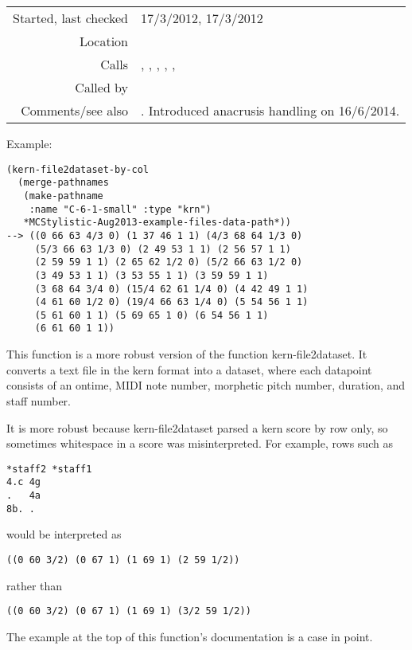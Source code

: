 \vspace{0.3cm}
\begin{tabular}{r|p{8cm}}
Started, last checked & 17/3/2012, 17/3/2012 \\
Location & \nameref{sec:kern-by-col} \\
Calls & \nameref{fun:kern-anacrusis-correction}, \nameref{fun:kern-col2dataset}, \newline \nameref{fun:kern-rows2col}, \nameref{fun:read-from-file-arbitrary}, \newline \nameref{fun:sort-dataset-asc}, \newline \nameref{fun:staves-info2staves-variable-robust} \\
Called by & \\
Comments/see also & \nameref{fun:kern-transp-file2dataset-by-col}. Intro\-duced \newline anacrusis handling on 16/6/2014.
\end{tabular}

\vspace{0.5cm}
\noindent Example:
\begin{verbatim}
(kern-file2dataset-by-col
  (merge-pathnames
   (make-pathname
    :name "C-6-1-small" :type "krn")
   *MCStylistic-Aug2013-example-files-data-path*))
--> ((0 66 63 4/3 0) (1 37 46 1 1) (4/3 68 64 1/3 0)
     (5/3 66 63 1/3 0) (2 49 53 1 1) (2 56 57 1 1)
     (2 59 59 1 1) (2 65 62 1/2 0) (5/2 66 63 1/2 0)
     (3 49 53 1 1) (3 53 55 1 1) (3 59 59 1 1)
     (3 68 64 3/4 0) (15/4 62 61 1/4 0) (4 42 49 1 1)
     (4 61 60 1/2 0) (19/4 66 63 1/4 0) (5 54 56 1 1)
     (5 61 60 1 1) (5 69 65 1 0) (6 54 56 1 1)
     (6 61 60 1 1))
\end{verbatim}

\noindent This function is a more robust version of
the function kern-file2dataset. It converts a text
file in the kern format into a dataset, where each
datapoint consists of an ontime, MIDI note number,
morphetic pitch number, duration, and staff number.

It is more robust because kern-file2dataset parsed
a kern score by row only, so sometimes whitespace in a
score was misinterpreted. For example, rows such as
\begin{verbatim}
*staff2	*staff1
4.c	4g
.	4a
8b.	.
\end{verbatim}
would be interpreted as
\begin{verbatim}
((0 60 3/2) (0 67 1) (1 69 1) (2 59 1/2))
\end{verbatim}
rather than
\begin{verbatim}
((0 60 3/2) (0 67 1) (1 69 1) (3/2 59 1/2))
\end{verbatim}
The example at the top of this function's
documentation is a case in point.



